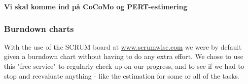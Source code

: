 \textbf{Vi skal komme ind på CoCoMo og PERT-estimering}

\subsubsection{Burndown charts}
With the use of the SCRUM board at \url{www.scrumwise.com} we were by default given a burndown chart without having to do any extra effort. We chose to use this "free service" to regularly check up on our progress, and to see if we had to stop and reevaluate anything - like the estimation for some or all of the tasks.
